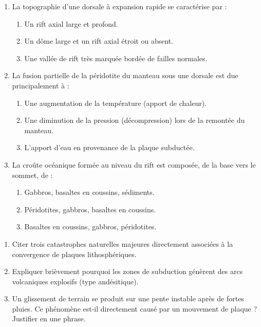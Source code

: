 \documentclass[11pt]{article}
\begin{document}
\begin{exercice}
\begin{enumerate}
    \item La topographie d'une dorsale à expansion rapide se caractérise par :
    \begin{enumerate}
        \item Un rift axial large et profond.
        \item Un dôme large et un rift axial étroit ou absent.
        \item Une vallée de rift très marquée bordée de failles normales.
    \end{enumerate}
    \item La fusion partielle de la péridotite du manteau sous une dorsale est due principalement à :
    \begin{enumerate}
        \item Une augmentation de la température (apport de chaleur).
        \item Une diminution de la pression (décompression) lors de la remontée du manteau.
        \item L'apport d'eau en provenance de la plaque subductée.
    \end{enumerate}
    \item La croûte océanique formée au niveau du rift est composée, de la base vers le sommet, de :
    \begin{enumerate}
        \item Gabbros, basaltes en coussins, sédiments.
        \item Péridotites, gabbros, basaltes en coussins.
        \item Basaltes en coussins, gabbros, péridotites.
    \end{enumerate}
\end{enumerate}
\end{exercice}

\begin{exercice}
\begin{enumerate}
    \item Citer trois catastrophes naturelles majeures directement associées à la convergence de plaques lithosphériques.
    \item Expliquer brièvement pourquoi les zones de subduction génèrent des arcs volcaniques explosifs (type andésitique).
    \item Un glissement de terrain se produit sur une pente instable après de fortes pluies. Ce phénomène est-il directement causé par un mouvement de plaque ? Justifier en une phrase.
\end{enumerate}
\end{exercice}
\end{document}
